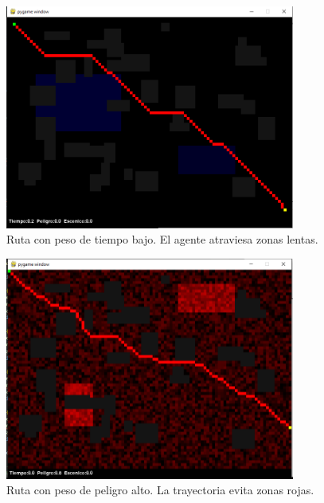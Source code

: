\documentclass[12pt,a4paper]{article}
\begin{document}
\begin{figure}[H]
    \centering
    \includegraphics[width=0.85\textwidth]{ruta_tiempo_bajo.png}
    \caption{Ruta con peso de tiempo bajo. El agente atraviesa zonas lentas.}
\end{figure}

\begin{figure}[H]
    \centering
    \includegraphics[width=0.85\textwidth]{ruta_peligro_alto.png}
    \caption{Ruta con peso de peligro alto. La trayectoria evita zonas rojas.}
\end{figure}
\end{document}
